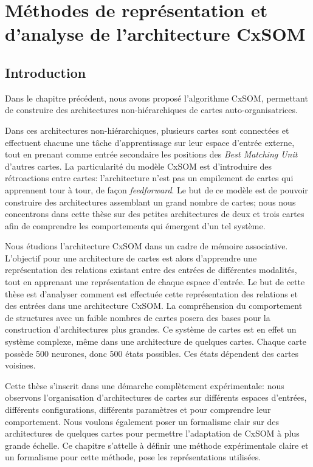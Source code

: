 \chapter{Méthodes de représentation et d'analyse de l'architecture CxSOM}
\graphicspath{{03-Representation/}}
\minitoc

\section{Introduction}
Dans le chapitre précédent, nous avons proposé l'algorithme CxSOM, permettant de construire des architectures non-hiérarchiques de cartes auto-organisatrices. 

Dans ces architectures non-hiérarchiques, plusieurs cartes sont connectées et effectuent chacune une tâche d'apprentissage sur leur espace d'entrée externe, tout en prenant comme entrée secondaire les positions des \emph{Best Matching Unit} d'autres cartes. La particularité du modèle CxSOM est d'introduire des rétroactions entre cartes: l'architecture n'est pas un empilement de cartes qui apprennent tour à tour, de façon \emph{feedforward}.
Le but de ce modèle est de pouvoir construire des architectures assemblant un grand nombre de cartes; nous nous concentrons dans cette thèse sur des petites architectures de deux et trois cartes afin de comprendre les comportements qui émergent d'un tel système.

Nous étudions l'architecture CxSOM dans un cadre de mémoire associative.
L'objectif pour une architecture de cartes est alors d'apprendre une représentation des relations existant entre des entrées de différentes modalités, tout en apprenant une représentation de chaque espace d'entrée.
Le but de cette thèse est d'analyser comment est effectuée cette représentation des relations et des entrées dans une architecture CxSOM.
La compréhension du comportement de structures avec un faible nombres de cartes posera des bases pour la construction d'architectures plus grandes.
Ce système de cartes est en effet un système complexe, même dans une architecture de quelques cartes. Chaque carte possède 500 neurones, donc 500 états possibles. Ces états dépendent des cartes voisines.


Cette thèse s'inscrit dans une démarche complètement expérimentale: nous observons l'organisation d'architectures de cartes sur différents espaces d'entrées, différents configurations, différents paramètres et pour comprendre leur comportement. Nous voulons également poser un formalisme clair sur des architectures de quelques cartes pour permettre l'adaptation de CxSOM à plus grande échelle.
Ce chapitre s'attelle à définir une méthode expérimentale claire et un formalisme pour cette méthode, pose les représentations utilisées.


